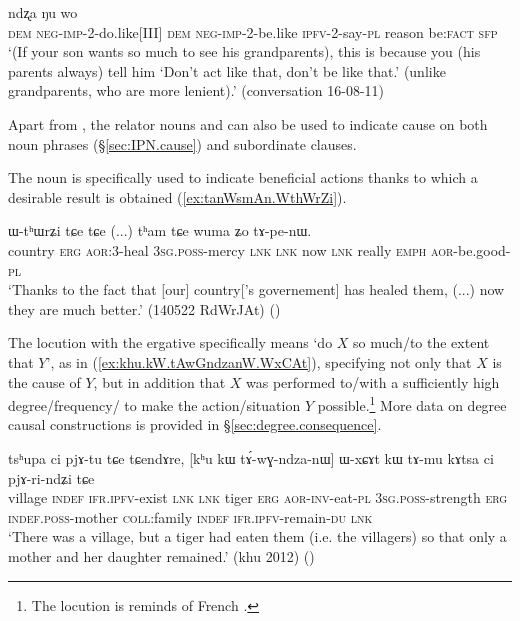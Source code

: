 \begin{exe}
\ex \label{ex:tutWtinW.ndzxa.Nu}
 ndʐa ŋu wo \\
\textsc{dem} \textsc{neg}-\textsc{imp}-2-do.like[III] \textsc{dem}  \textsc{neg}-\textsc{imp}-2-be.like \textsc{ipfv}-2-say-\textsc{pl} reason be:\textsc{fact} \textsc{sfp} \\
\glt `(If your son wants so much to see his grandparents), this is because you (his parents always) tell him `Don't act like that, don't be like that.' (unlike grandparents, who are more lenient).' (conversation 16-08-11)
\end{exe}

Apart from , the relator nouns  and 
can also be used to indicate cause on both noun phrases (§\ref{sec:IPN.cause}) and subordinate clauses.

The noun  is specifically used to indicate beneficial actions thanks to which a desirable result is obtained (\ref{ex:tanWsmAn.WthWrZi}).

\begin{exe}
\ex \label{ex:tanWsmAn.WthWrZi}
 ɯ-tʰɯrʑi tɕe tɕe  (...) tʰam tɕe wuma ʑo tɤ-pe-nɯ. \\
country \textsc{erg} \textsc{aor}:3\flobv{}-heal \textsc{3sg}.\textsc{poss}-mercy \textsc{lnk} \textsc{lnk} { } now \textsc{lnk} really \textsc{emph} \textsc{aor}-be.good-\textsc{pl} \\
\glt `Thanks to the fact that [our] country['s governement] has healed them, (...) now they are much better.' (140522 RdWrJAt)
()
\end{exe}

The locution  with the ergative specifically means `do $X$ so much/to the extent that $Y$', as in (\ref{ex:khu.kW.tAwGndzanW.WxCAt}), specifying not only that $X$ is the cause of $Y$, but in addition that $X$ was performed to/with a sufficiently high degree/frequency/ to make the action/situation $Y$ possible.\footnote{The locution  is reminds of French . } More data on degree causal constructions is provided in §\ref{sec:degree.consequence}.

\begin{exe}
\ex \label{ex:khu.kW.tAwGndzanW.WxCAt}
\gll tsʰupa ci pjɤ-tu tɕe tɕendɤre, [kʰu kɯ tɤ́-wɣ-ndza-nɯ] ɯ-xɕɤt kɯ tɤ-mu kɤtsa ci pjɤ-ri-ndʑi tɕe \\
village \textsc{indef} \textsc{ifr}.\textsc{ipfv}-exist \textsc{lnk} \textsc{lnk} tiger \textsc{erg} \textsc{aor}-\textsc{inv}-eat-\textsc{pl} \textsc{3sg}.\textsc{poss}-strength \textsc{erg} \textsc{indef}.\textsc{poss}-mother \textsc{coll}:family \textsc{indef} \textsc{ifr}.\textsc{ipfv}-remain-\textsc{du} \textsc{lnk} \\
\glt `There was a village, but a tiger had eaten them (i.e. the villagers) so that only a mother and her daughter remained.' (khu 2012)
()
\end{exe}
 
